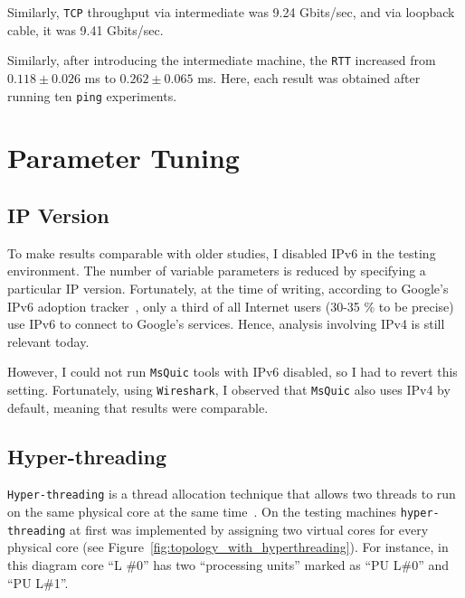 \documentclass[12pt,a4paper]{report}
\begin{document}
    Similarly, \texttt{TCP} throughput via intermediate was 9.24 Gbits/sec, and via loopback cable, it was 9.41 Gbits/sec.


    Similarly, after introducing the intermediate machine, the \texttt{RTT} increased from
    $0.118 \pm 0.026$ ms to $0.262 \pm 0.065$ ms.
    Here, each result was obtained after running ten \texttt{ping} experiments.
    




\section{Parameter Tuning}

\subsection{IP Version}

To make results comparable with older studies, I disabled IPv6 in the testing environment.
The number of variable parameters is reduced by specifying a particular IP version.
Fortunately, at the time of writing, according to Google's IPv6 adoption tracker~\cite{IPv6_Adoption_Statistics}, only a third of all Internet users (30-35 \% to be precise) use IPv6 to connect to Google's services.
Hence, analysis involving IPv4 is still relevant today.

However, I could not run \texttt{MsQuic} tools with IPv6 disabled, so I had to revert this setting.
Fortunately, using \texttt{Wireshark}, I observed that \texttt{MsQuic} also uses IPv4 by default, meaning that results were comparable.

\subsection{Hyper-threading}\label{Hyperthreading_Subsection_Tag}

\texttt{Hyper-threading} is a thread allocation technique that allows two threads to run on the same physical core at the same time~\cite[page~ 23]{hyperthreading_book}.
On the testing machines \texttt{hyper-threading} at first was implemented by assigning two virtual cores for every physical core (see Figure~\ref{fig:topology_with_hyperthreading}).
For instance, in this diagram core \enquote{L \#0} has two \enquote{processing units} marked as \enquote{PU L\#0} and \enquote{PU L\#1}.
\end{document}
